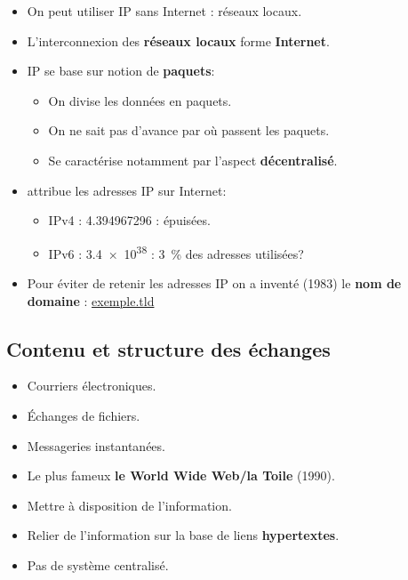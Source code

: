 \begin{slide}
	\begin{itemize}
		\item On peut utiliser IP sans Internet : réseaux locaux.
		\item L'interconnexion des \textbf{réseaux locaux} forme \textbf{Internet}.
		\item IP se base sur notion de \textbf{paquets}:
			\begin{itemize}
				\item On divise les données en paquets.
				\item On ne sait pas d'avance par où passent les paquets.
				\item Se caractérise notamment par l'aspect \textbf{décentralisé}.
			\end{itemize}
		\item {} attribue les adresses IP sur Internet:
			\begin{itemize}
				\item IPv4 : \num{4,3 94 967 296} : épuisées.
				\item IPv6 : \num{3,4e38} : \SI{3}{\percent} des adresses utilisées?
			\end{itemize}
		\item Pour éviter de retenir les adresses IP on a inventé (1983) le \textbf{nom de domaine} : \url{exemple.tld}
	\end{itemize}

\end{slide}


\subsection{Contenu et structure des échanges} 

\begin{slide}
	\begin{itemize}
		\item Courriers électroniques.
		\item Échanges de fichiers.
		\item Messageries instantanées.
		\item Le plus fameux \textbf{le World Wide Web/la Toile} (1990).
	\end{itemize}
\end{slide}


\begin{slide}
	\begin{itemize}
		\item Mettre à disposition de l'information.
		\item Relier de l'information sur la base de liens \textbf{hypertextes}.
		\item Pas de système centralisé.
	\end{itemize}
\end{slide}

